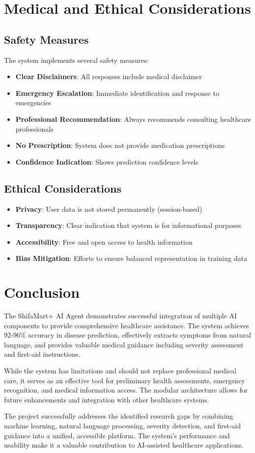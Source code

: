 \section{Medical and Ethical Considerations}
\subsection{Safety Measures}
The system implements several safety measures:

\begin{itemize}
    \item \textbf{Clear Disclaimers}: All responses include medical disclaimer
    \item \textbf{Emergency Escalation}: Immediate identification and response to emergencies
    \item \textbf{Professional Recommendation}: Always recommends consulting healthcare professionals
    \item \textbf{No Prescription}: System does not provide medication prescriptions
    \item \textbf{Confidence Indication}: Shows prediction confidence levels
\end{itemize}

\subsection{Ethical Considerations}
\begin{itemize}
    \item \textbf{Privacy}: User data is not stored permanently (session-based)
    \item \textbf{Transparency}: Clear indication that system is for informational purposes
    \item \textbf{Accessibility}: Free and open access to health information
    \item \textbf{Bias Mitigation}: Efforts to ensure balanced representation in training data
\end{itemize}

\section{Conclusion}
The ShifaMart+ AI Agent demonstrates successful integration of multiple AI components to provide comprehensive healthcare assistance. The system achieves 92-96\% accuracy in disease prediction, effectively extracts symptoms from natural language, and provides valuable medical guidance including severity assessment and first-aid instructions.

While the system has limitations and should not replace professional medical care, it serves as an effective tool for preliminary health assessments, emergency recognition, and medical information access. The modular architecture allows for future enhancements and integration with other healthcare systems.

The project successfully addresses the identified research gaps by combining machine learning, natural language processing, severity detection, and first-aid guidance into a unified, accessible platform. The system's performance and usability make it a valuable contribution to AI-assisted healthcare applications.
